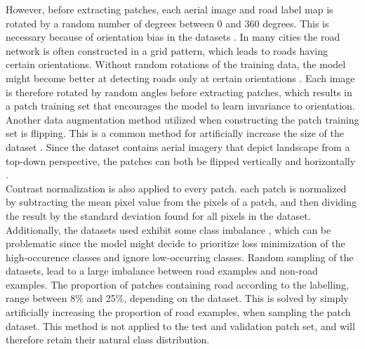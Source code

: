 However, before extracting patches, each aerial image and road label map is rotated by a random number of degrees between 0 and 360 degrees. This is necessary because of orientation bias in the datasets . In many cities the road network is often constructed in a grid pattern, which leads to roads having certain orientations. Without random rotations of the training data, the model might become better at detecting roads only at certain orientations \citep{Mnih_roads_high_res_aerial_images}. Each image is therefore rotated by random angles before extracting patches, which results in a patch training set that encourages the model to learn invariance to orientation.\\

Another data augmentation method utilized when constructing the patch training set is flipping. This is a common method for artificially increase the size of the dataset \citep{Krizhevsky_imagenet}. Since the dataset contains aerial imagery that depict landscape from a top-down perspective, the patches can both be flipped vertically and horizontally .\\

Contrast normalization is also applied to every patch. each patch is normalized by subtracting the mean pixel value from the pixels of a patch, and then dividing the result by the standard deviation found for all pixels in the dataset.\\

Additionally, the datasets used exhibit some class imbalance \citep{Japkowicz_class_imbalance}, which can be problematic since the model might decide to prioritize loss minimization of the high-occurence classes and ignore low-occurring classes. Random sampling of the datasets, lead to a large imbalance between road examples and non-road examples. The proportion of patches containing road according to the labelling, range between 8\% and 25\%, depending on the dataset. This is solved by simply artificially increasing the proportion of road examples, when sampling the patch dataset. This method is not applied to the test and validation patch set, and will therefore retain their natural class distribution.\\